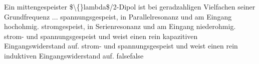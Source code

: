     {Ein mittengespeister \$\textbackslash\{\}lambda\$/2-Dipol ist bei geradzahligen Vielfachen seiner Grundfrequenz ...}
    {spannungsgespeist, in Parallelresonanz und am Eingang hochohmig.}
    {stromgespeist, in Serienresonanz und am Eingang niederohmig.}
    {strom- und spannungsgespeist und weist einen rein kapazitiven Eingangswiderstand auf.}
    {strom- und spannungsgespeist und weist einen rein induktiven Eingangswiderstand auf.}
    {false}{false}